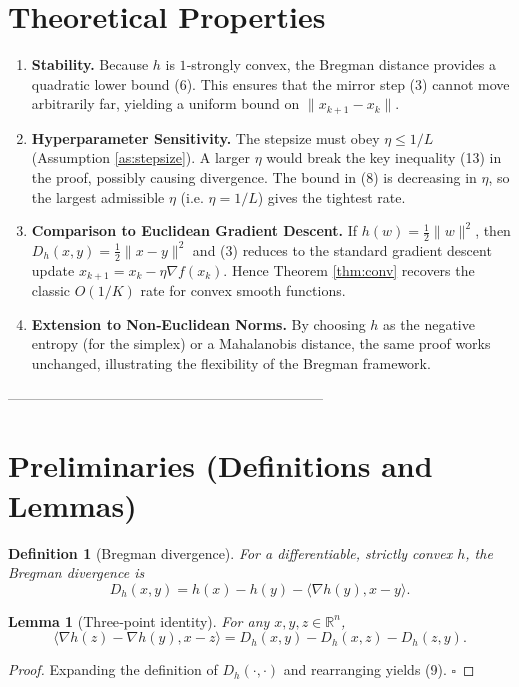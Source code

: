 \documentclass{article}
\newtheorem{lemma}{Lemma}
\newtheorem{definition}{Definition}
\newcommand{\R}{\mathbb{R}}
\newcommand{\inner}[2]{\langle #1,#2\rangle}
\newcommand{\Breg}[2]{D_{h}(#1,#2)}
\newcommand{\grad}{\nabla}
\begin{document}
\section*{Theoretical Properties}
\begin{enumerate}[label=\arabic*.]
    \item \textbf{Stability.} Because $h$ is $1$‑strongly convex, the Bregman distance provides a quadratic lower bound (6). This ensures that the mirror step (3) cannot move arbitrarily far, yielding a uniform bound on $\|x_{k+1}-x_{k}\|$.
    \item \textbf{Hyperparameter Sensitivity.} The stepsize must obey $\eta\le 1/L$ (Assumption \ref{as:stepsize}). A larger $\eta$ would break the key inequality (13) in the proof, possibly causing divergence. The bound in (8) is decreasing in $\eta$, so the largest admissible $\eta$ (i.e. $\eta=1/L$) gives the tightest rate.
    \item \textbf{Comparison to Euclidean Gradient Descent.} If $h(w)=\tfrac12\|w\|^{2}$, then $\Breg{x}{y}=\tfrac12\|x-y\|^{2}$ and (3) reduces to the standard gradient descent update $x_{k+1}=x_{k}-\eta\grad f(x_{k})$. Hence Theorem \ref{thm:conv} recovers the classic $O(1/K)$ rate for convex smooth functions.
    \item \textbf{Extension to Non‑Euclidean Norms.} By choosing $h$ as the negative entropy (for the simplex) or a Mahalanobis distance, the same proof works unchanged, illustrating the flexibility of the Bregman framework.
\end{enumerate}

--------------------------------------------------------------------

\section*{Preliminaries (Definitions and Lemmas)}
\begin{definition}[Bregman divergence]
For a differentiable, strictly convex $h$, the Bregman divergence is
\[
\Breg{x}{y}=h(x)-h(y)-\inner{\grad h(y)}{x-y}.
\]
\end{definition}

\begin{lemma}[Three‑point identity]\label{lem:three}
For any $x,y,z\in\R^{n}$,
\[
\inner{\grad h(z)-\grad h(y)}{x-z}
= \Breg{x}{y}-\Breg{x}{z}-\Breg{z}{y}.
\tag{9}
\]
\end{lemma}
\begin{proof}
Expanding the definition of $\Breg{\cdot}{\cdot}$ and rearranging yields (9). \hfill $\square$
\end{proof}
\end{document}
